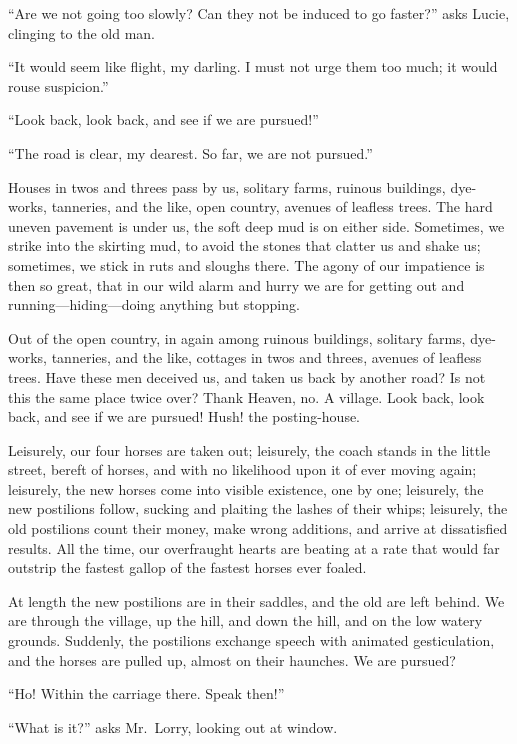 ``Are we not going too slowly?  Can they not be induced to go faster?''
asks Lucie, clinging to the old man.

``It would seem like flight, my darling.  I must not urge them too much;
it would rouse suspicion.''

``Look back, look back, and see if we are pursued!''

``The road is clear, my dearest.  So far, we are not pursued.''

Houses in twos and threes pass by us, solitary farms, ruinous
buildings, dye-works, tanneries, and the like, open country, avenues
of leafless trees.  The hard uneven pavement is under us, the soft
deep mud is on either side.  Sometimes, we strike into the skirting
mud, to avoid the stones that clatter us and shake us; sometimes, we
stick in ruts and sloughs there.  The agony of our impatience is then
so great, that in our wild alarm and hurry we are for getting out and
running---hiding---doing anything but stopping.

Out of the open country, in again among ruinous buildings, solitary
farms, dye-works, tanneries, and the like, cottages in twos and
threes, avenues of leafless trees.  Have these men deceived us, and
taken us back by another road?  Is not this the same place twice over?
Thank Heaven, no. A village.  Look back, look back, and see if we are
pursued!  Hush! the posting-house.

Leisurely, our four horses are taken out; leisurely, the coach stands
in the little street, bereft of horses, and with no likelihood upon
it of ever moving again; leisurely, the new horses come into visible
existence, one by one; leisurely, the new postilions follow, sucking
and plaiting the lashes of their whips; leisurely, the old postilions
count their money, make wrong additions, and arrive at dissatisfied
results.  All the time, our overfraught hearts are beating at a rate
that would far outstrip the fastest gallop of the fastest horses ever
foaled.

At length the new postilions are in their saddles, and the old are
left behind.  We are through the village, up the hill, and down the
hill, and on the low watery grounds.  Suddenly, the postilions
exchange speech with animated gesticulation, and the horses are
pulled up, almost on their haunches.  We are pursued?

``Ho!  Within the carriage there.  Speak then!''

``What is it?'' asks Mr.\ Lorry, looking out at window.

